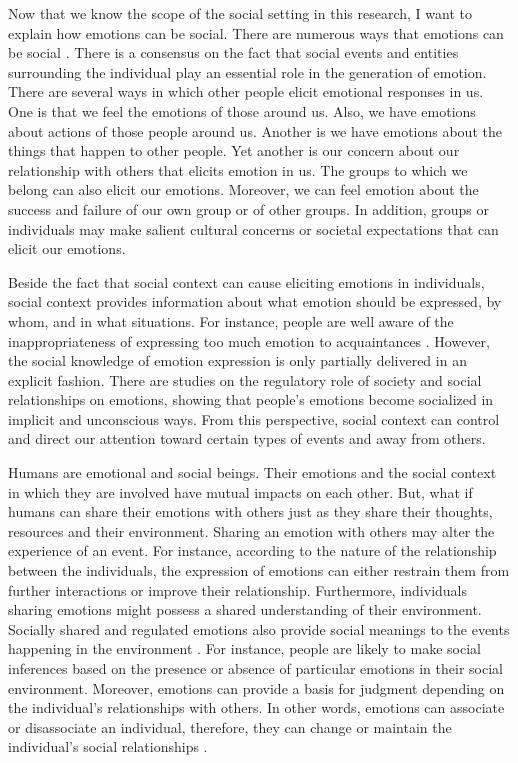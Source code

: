 \documentclass[12pt]{report}
\begin{document}
Now that we know the scope of the social setting in this research, I want to
explain how emotions can be social. There are numerous ways that emotions can be
social \cite{tiedens:social-life}. There is a consensus on the fact that social
events and entities surrounding the individual play an essential role in the
generation of emotion. There are several ways in which other people elicit
emotional responses in us. One is that we feel the emotions of those around us.
Also, we have emotions about actions of those people around us. Another is we
have emotions about the things that happen to other people. Yet another is our
concern about our relationship with others that elicits emotion in us. The
groups to which we belong can also elicit our emotions. Moreover, we can feel
emotion about the success and failure of our own group or of other groups. In
addition, groups or individuals may make salient cultural concerns or societal
expectations that can elicit our emotions.

Beside the fact that social context can cause eliciting emotions in individuals,
social context provides information about what emotion should be expressed, by
whom, and in what situations. For instance, people are well aware of the
inappropriateness of expressing too much emotion to acquaintances
\cite{tiedens:social-life}. However, the social knowledge of emotion expression
is only partially delivered in an explicit fashion. There are studies on the
regulatory role of society and social relationships on emotions, showing that
people's emotions become socialized in implicit and unconscious ways. From this
perspective, social context can control and direct our attention toward certain
types of events and away from others.

Humans are emotional and social beings. Their emotions and the social context
in which they are involved have mutual impacts on each other. But, what if
humans can share their emotions with others just as they share their thoughts,
resources and their environment. Sharing an emotion with others may alter the
experience of an event. For instance, according to the nature of the
relationship between the individuals, the expression of emotions can either
restrain them from further interactions or improve their relationship.
Furthermore, individuals sharing emotions might possess a shared understanding
of their environment. Socially shared and regulated emotions also provide social
meanings to the events happening in the environment
\cite{wisecup:sociology-emotions}. For instance, people are likely to make
social inferences based on the presence or absence of particular emotions in
their social environment. Moreover, emotions can provide a basis for judgment
depending on the individual's relationships with others. In other words,
emotions can associate or disassociate an individual, therefore, they can change
or maintain the individual's social relationships \cite{tiedens:social-life}.
\end{document}
